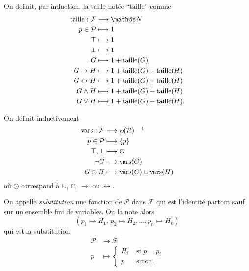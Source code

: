 \begin{defn}
	On définit, par induction, la taille notée ``$\mathrm{taille}$\/'' comme
	\begin{align*}
		\mathrm{taille}: \mathcal{F} &\longrightarrow \N \\
		p \in \mathcal{P} &\longmapsto 1\\
		\top &\longmapsto 1\\
		\bot &\longmapsto 1\\
		\lnot G &\longmapsto 1 + \mathrm{taille}(G)\\
		 G \to H &\longmapsto 1 + \mathrm{taille}(G) + \mathrm{taille}(H)\\
		 G \leftrightarrow H &\longmapsto 1 + \mathrm{taille}(G) + \mathrm{taille}(H)\\
		 G \land H &\longmapsto 1 + \mathrm{taille}(G) + \mathrm{taille}(H)\\
		 G \lor H &\longmapsto 1 + \mathrm{taille}(G) + \mathrm{taille}(H).
	\end{align*}
\end{defn}

\begin{defn}
	On définit inductivement
	\begin{align*}
		\mathrm{vars}: \mathcal{F} &\longrightarrow \wp(\mathcal{P})\quad\hbox{}\footnotemark\\
		p \in \mathcal{P} &\longmapsto \{p\}\\
		\top,\bot &\longmapsto \O\\
		\lnot G &\longmapsto \mathrm{vars}(G)\\
		G \odot H&\longmapsto \mathrm{vars}(G) \cup \mathrm{vars}(H)\\
	\end{align*}
	où $\odot$\/ correspond à $\cup$, $\cap$, $\to$ ou $\leftrightarrow$.
\end{defn}

\begin{defn}
	On appelle {\it substitution}\/ une fonction de $\mathcal{P}$\/ dans $\mathcal{F}$\/ qui est l'identité partout sauf sur un ensemble fini de variables.
	On la note alors \[
		(p_1 \mapsto H_1,\,p_2\mapsto H_2,\ldots,p_n\mapsto H_n)
	\] qui est la substitution
	\begin{align*}
		\mathcal{P} &\longrightarrow \mathcal{F} \\
		p &\longmapsto \begin{cases}
			H_i &\text{ si } p = p_i\\
			p &\text{ sinon}.
		\end{cases}
	\end{align*}
\end{defn}

